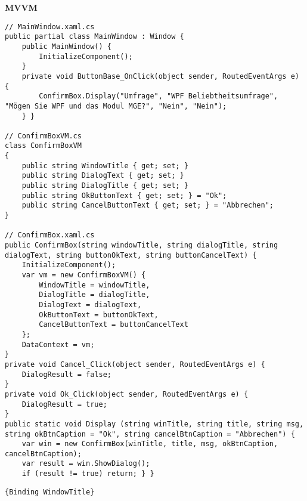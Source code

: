 \textbf{MVVM}
\begin{lstlisting}
// MainWindow.xaml.cs
public partial class MainWindow : Window {
    public MainWindow() {
        InitializeComponent();
    }
    private void ButtonBase_OnClick(object sender, RoutedEventArgs e) {
        ConfirmBox.Display("Umfrage", "WPF Beliebtheitsumfrage", "Mögen Sie WPF und das Modul MGE?", "Nein", "Nein");
    } }

// ConfirmBoxVM.cs
class ConfirmBoxVM
{
    public string WindowTitle { get; set; }
    public string DialogText { get; set; }
    public string DialogTitle { get; set; }
    public string OkButtonText { get; set; } = "Ok";
    public string CancelButtonText { get; set; } = "Abbrechen";
}

// ConfirmBox.xaml.cs
public ConfirmBox(string windowTitle, string dialogTitle, string dialogText, string buttonOkText, string buttonCancelText) {
    InitializeComponent();
    var vm = new ConfirmBoxVM() {
        WindowTitle = windowTitle,
        DialogTitle = dialogTitle,
        DialogText = dialogText,
        OkButtonText = buttonOkText,
        CancelButtonText = buttonCancelText
    };
    DataContext = vm;
}
private void Cancel_Click(object sender, RoutedEventArgs e) {
    DialogResult = false;
}
private void Ok_Click(object sender, RoutedEventArgs e) {
    DialogResult = true;
}
public static void Display (string winTitle, string title, string msg, string okBtnCaption = "Ok", string cancelBtnCaption = "Abbrechen") {
    var win = new ConfirmBox(winTitle, title, msg, okBtnCaption, cancelBtnCaption);
    var result = win.ShowDialog();
    if (result != true) return; } }
\end{lstlisting}
\begin{lstlisting}[language=xaml]
{Binding WindowTitle}
\end{lstlisting}